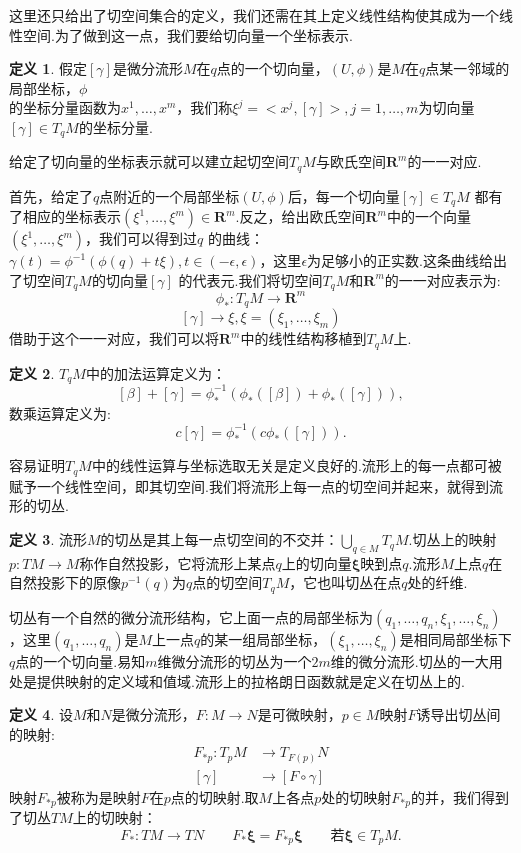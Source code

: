 \documentclass[UTF8,10.5pt,a4paper]{ctexart}
\numberwithin{equation}{section}
\theoremstyle{definition}
\theoremstyle{definition}
\newtheorem{dfn}{定义\hspace{0.05pt}}[section]
\begin{document}
这里还只给出了切空间集合的定义，我们还需在其上定义线性结构使其成为一个线性空间.为了做到这一点，我们要给切向量一个坐标表示.
\begin{dfn}
假定$[\gamma]$是微分流形$M$在$q$点的一个切向量，$(U,\phi)$是$M$在$q$点某一邻域的局部坐标，$\phi$\\ 的坐标分量函数为$x^1,\ldots,x^m$，我们称$\xi^j=<x^j,[\gamma]>,j=1,\ldots,m$为切向量$[\gamma]\in T_qM$的坐标分量.
\end{dfn}
给定了切向量的坐标表示就可以建立起切空间$T_qM$与欧氏空间$\textbf{R}^m$的一一对应.
\par 首先，给定了$q$点附近的一个局部坐标$(U,\phi)$后，每一个切向量$[\gamma]\in T_qM$ 都有了相应的坐标表示$(\xi^1,\ldots,\xi^m)\in\textbf{R}^m$.反之，给出欧氏空间$\textbf{R}^m$中的一个向量$(\xi^1,\ldots,\xi^m)$，我们可以得到过$q$ 的曲线：$\gamma(t)=\phi^{-1}(\phi(q)+t\xi),t\in(-\epsilon,\epsilon)$，这里$\epsilon$为足够小的正实数.这条曲线给出了切空间$T_qM$的切向量$[\gamma]$ 的代表元.我们将切空间$T_qM$和$\textbf{R}^m$的一一对应表示为:
$$\phi_*:T_qM\rightarrow\textbf{R}^m$$
$$[\gamma]\rightarrow\xi,\xi=(\xi_1,\ldots,\xi_m)$$
借助于这个一一对应，我们可以将$\textbf{R}^m$中的线性结构移植到$T_qM$上.
\begin{dfn}
$T_qM$中的加法运算定义为：$$[\beta]+[\gamma]=\phi_*^{-1}(\phi_*([\beta])+\phi_*([\gamma])),$$
数乘运算定义为:$$c[\gamma]=\phi_*^{-1}(c\phi_*([\gamma])).$$
\end{dfn}
\par 容易证明$T_qM$中的线性运算与坐标选取无关是定义良好的.流形上的每一点都可被赋予一个线性空间，即其切空间.我们将流形上每一点的切空间并起来，就得到流形的切丛.
\begin{dfn}
流形$M$的切丛是其上每一点切空间的不交并：$\bigcup\limits_{q\in M}T_{q}M$.切丛上的映射$p:TM\rightarrow M$称作自然投影，它将流形上某点$q$上的切向量$\mathbf{\xi}$映到点$q$.流形$M$上点$q$在自然投影下的原像$p^{-1}(q)$为$q$点的切空间$T_{q}M$，它也叫切丛在点$q$处的纤维.
\end{dfn}
切丛有一个自然的微分流形结构，它上面一点的局部坐标为$(q_1,\ldots,q_n,\xi_1,\dots,\xi_n)$，这里$(q_1,\ldots,q_n)$是$M$上一点$q$的某一组局部坐标，$(\xi_1,\dots,\xi_n)$是相同局部坐标下$q$点的一个切向量.易知$m$维微分流形的切丛为一个$2m$维的微分流形.切丛的一大用处是提供映射的定义域和值域.流形上的拉格朗日函数就是定义在切丛上的.
\begin{dfn}
设$M$和$N$是微分流形，$F:M\rightarrow N$是可微映射，$p\in M$映射$F$诱导出切丛间的映射:
\begin{align*}
F_{*p}:T_pM&\rightarrow T_{F(p)}N\\
[\gamma]&\rightarrow [F\circ \gamma]
\end{align*}
映射$F_{*p}$被称为是映射$F$在$p$点的切映射.取$M$上各点$p$处的切映射$F_{*p}$的并，我们得到了切丛$TM$上的切映射：
$$F_{*}:TM \rightarrow TN  \qquad F_{*}\mathbf{\xi}=F_{*p}\mathbf{\xi} \qquad \text{若}\mathbf{\xi}\in T_pM .$$
\end{dfn}
\end{document}
